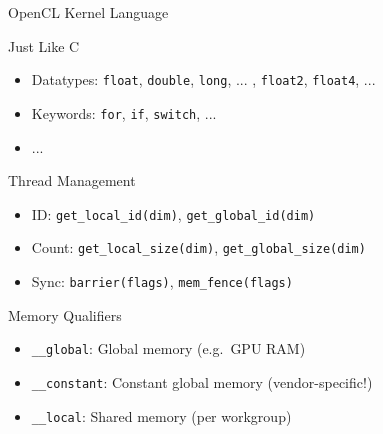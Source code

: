 \begin{frame}[fragile]{OpenCL Kernel Language}

 \begin{block}{Just Like C}
  \begin{itemize}
   \item Datatypes: \lstinline|float|, \lstinline|double|, \lstinline|long|, ... , \lstinline|float2|, \lstinline|float4|, ...
   \item Keywords: \lstinline|for|, \lstinline|if|, \lstinline|switch|, ...
   \item ...
  \end{itemize}
 \end{block}

 \begin{block}{Thread Management}
  \begin{itemize}
   \item ID: \lstinline|get_local_id(dim)|, \lstinline|get_global_id(dim)|
   \item Count: \lstinline|get_local_size(dim)|, \lstinline|get_global_size(dim)|
   \item Sync: \lstinline|barrier(flags)|, \lstinline|mem_fence(flags)|
  \end{itemize}
 \end{block}

 \begin{block}{Memory Qualifiers}
  \begin{itemize}
   \item \lstinline|__global|: Global memory (e.g.~GPU RAM)
   \item \lstinline|__constant|: Constant global memory (vendor-specific!)
   \item \lstinline|__local|: Shared memory (per workgroup)
  \end{itemize}
 \end{block}

\end{frame}




